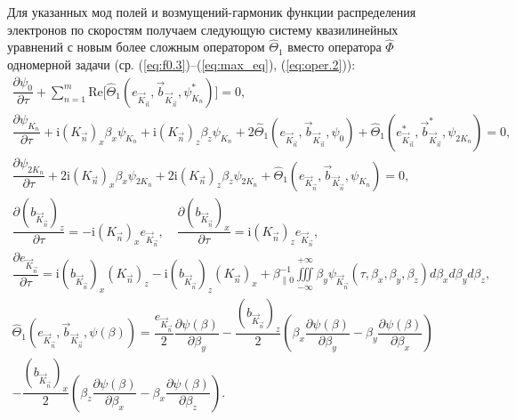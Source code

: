 Для указанных мод полей и возмущений-гармоник функции распределения электронов по скоростям получаем следующую систему квазилинейных уравнений с новым более сложным оператором $\hat \Theta_1$ вместо оператора $\hat \Phi$ одномерной задачи (ср. (\ref{eq:f0.3})--(\ref{eq:max_eq}), (\ref{eq:oper.2})): 
\begin{align}
\label{eq:f0.4}
\dfrac{\partial \psi_0}{\partial \tau}+\sum\limits^{m}_{n=1}\mathrm{Re}\Bigg[\hat \Theta_1\left(e_{\vec{K}_{\vec{n}}},{\vec{b}}_{\vec{K}_{\vec{n}}},\psi_{K_n}^*\right)\Bigg]=0,\\
\label{eq:f1.4}\dfrac{\partial \psi_{K_n}}{\partial \tau}+\mathrm{i}\left(K_{\vec{n}}\right)_x\beta_x\psi_{K_n}+\mathrm{i}\left(K_{\vec{n}}\right)_z\beta_z\psi_{K_n}+2\hat \Theta_1\left(e_{\vec{K}_{\vec{n}}},{\vec{b}}_{\vec{K}_{\vec{n}}},\psi_{0}\right)+\hat \Theta_1\left(e_{\vec{K}_{\vec{n}}}^*,{\vec{b}}_{\vec{K}_{\vec{n}}}^*,\psi_{2K_n}\right)=0,\\
\label{eq:f2.4}
\dfrac{\partial \psi_{2K_n}}{\partial \tau}+2\mathrm{i}\left(K_{\vec{n}}\right)_x\beta_x\psi_{2K_n}+2\mathrm{i}\left(K_{\vec{n}}\right)_z\beta_z\psi_{2K_n}+\hat \Theta_1\left(e_{\vec{K}_{\vec{n}}},{\vec{b}}_{\vec{K}_{\vec{n}}},\psi_{K_n}\right)=0,\\
    \dfrac{\partial \left({b}_{\vec{K}_{\vec{n}}}\right)_z}{\partial \tau}=-\mathrm{i}\left(K_{\vec{n}}\right)_xe_{\vec{K}_{\vec{n}}},\quad 
    \dfrac{\partial \left({b}_{\vec{K}_{\vec{n}}}\right)_x}{\partial \tau}=\mathrm{i}\left(K_{\vec{n}}\right)_ze_{\vec{K}_{\vec{n}}}, \\
\label{eq:maxw3.3}
    \dfrac{\partial e_{\vec{K}_{\vec{n}}}}{\partial \tau}=\mathrm{i}\left({b}_{\vec{K}_{\vec{n}}}\right)_x\left(K_{\vec{n}}\right)_z-\mathrm{i}\left({b}_{\vec{K}_{\vec{n}}}\right)_z\left(K_{\vec{n}}\right)_x+\beta_{\|0}^{-1}{\iiint\limits^{+\infty}_{-\infty}\beta_y\psi_{\vec{K}_{\vec{n}}}(\tau,\beta_x,\beta_y,\beta_z)d\beta_xd\beta_yd\beta_z} ,\\
\label{eq:oper.4}
\hat \Theta_1\left(e_{\vec{K}_{\vec{n}}},{\vec{b}}_{\vec{K}_{\vec{n}}},\psi(\beta)\right)  =  \dfrac{e_{\vec{K}_{\vec{n}}}}{2}\dfrac{\partial \psi(\beta)}{\partial \beta_y}-\dfrac{\left({b}_{\vec{K}_{\vec{n}}}\right)_z}{2} \left(\beta_x\dfrac{\partial \psi(\beta)}{\partial \beta_y}-\beta_y\dfrac{\partial \psi(\beta)}{\partial \beta_x}\right) \nonumber \\
-\dfrac{\left({b}_{\vec{K}_{\vec{n}}}\right)_x}{2} \left(\beta_z\dfrac{\partial \psi(\beta)}{\partial \beta_x}-\beta_x\dfrac{\partial \psi(\beta)}{\partial \beta_z}\right) .
\end{align}


